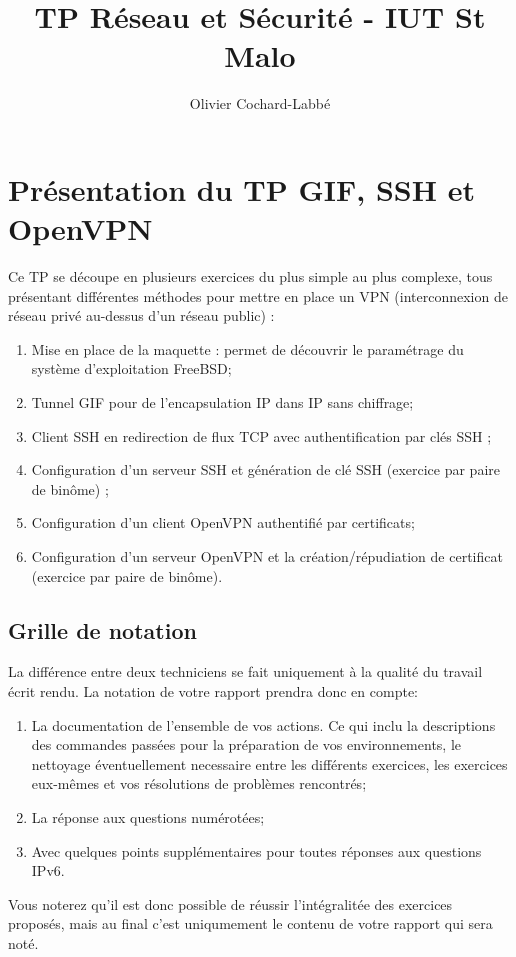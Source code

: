 \documentclass[a4paper,11pt]{article}
\author{Olivier Cochard-Labbé}
\title{TP Réseau et Sécurité - IUT St Malo}
\begin{document}
\maketitle
\tableofcontents
\clearpage
\sloppy
\section{Présentation du TP GIF, SSH et OpenVPN}
Ce TP se découpe en plusieurs exercices du plus simple au plus complexe, tous présentant différentes méthodes pour mettre en place un VPN (interconnexion de réseau privé au-dessus d'un réseau public) :
\begin{enumerate}
\item  Mise en place de la maquette : permet de découvrir le paramétrage du système d'exploitation FreeBSD;
\item Tunnel GIF pour de l'encapsulation IP dans IP sans chiffrage;
\item Client SSH en redirection de flux TCP avec authentification par clés SSH ;
\item Configuration d'un serveur SSH et génération de clé SSH (exercice par paire de binôme) ;
\item Configuration d'un client OpenVPN authentifié par certificats;
\item Configuration d'un serveur OpenVPN et la création/répudiation de certificat (exercice par paire de binôme).
\end{enumerate}
\subsection{Grille de notation}
La différence entre deux techniciens se fait uniquement à la qualité du travail écrit rendu. La notation de votre rapport prendra donc en compte:
\begin{enumerate}
\item La documentation de l'ensemble de vos actions. Ce qui inclu la descriptions des commandes passées pour la préparation de vos environnements, le nettoyage éventuellement necessaire entre les différents exercices, les exercices eux-mêmes et vos résolutions de problèmes rencontrés;
\item La réponse aux questions numérotées;
\item Avec quelques points supplémentaires pour toutes réponses aux questions IPv6.
\end{enumerate}
Vous noterez qu'il est donc possible de réussir l'intégralitée des exercices proposés, mais au final c'est uniqumement le contenu de votre rapport qui sera noté.
\end{document}
